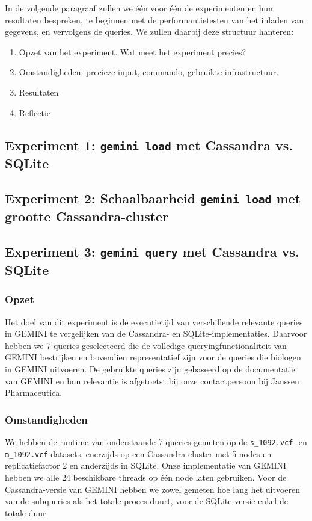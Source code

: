 In de volgende paragraaf zullen we \'e\'en voor \'e\'en de experimenten en hun resultaten bespreken, te beginnen met de performantietesten van het inladen van gegevens, en vervolgens de queries. We zullen daarbij deze structuur hanteren:
\begin{enumerate}
\item Opzet van het experiment. Wat meet het experiment precies?
\item Omstandigheden: precieze input, commando, gebruikte infrastructuur.
\item Resultaten
\item Reflectie
\end{enumerate}

\subsection{Experiment 1: \texttt{gemini load} met Cassandra vs. SQLite}
\label{exp1}
\subsection{Experiment 2: Schaalbaarheid \texttt{gemini load} met grootte Cassandra-cluster}
\label{exp2}
\subsection{Experiment 3: \texttt{gemini query} met Cassandra vs. SQLite}
\label{exp3}

\subsubsection{Opzet}
Het doel van dit experiment is de executietijd van verschillende relevante queries in GEMINI te vergelijken van de Cassandra- en SQLite-implementaties. Daarvoor hebben we 7 queries geselecteerd die de volledige queryingfunctionaliteit van GEMINI bestrijken en bovendien representatief zijn voor de queries die biologen in GEMINI uitvoeren. De gebruikte queries zijn gebaseerd op de documentatie van GEMINI en hun relevantie is afgetoetst bij onze contactpersoon bij Janssen Pharmaceutica.

\subsubsection{Omstandigheden}

We hebben de runtime van onderstaande 7 queries gemeten op de \texttt{s\_1092.vcf}- en \texttt{m\_1092.vcf}-datasets, enerzijds op een Cassandra-cluster met 5 nodes en replicatiefactor 2 en anderzijds in SQLite. Onze implementatie van GEMINI hebben we alle 24 beschikbare threads op \'e\'en node laten gebruiken. Voor de Cassandra-versie van GEMINI hebben we zowel gemeten hoe lang het uitvoeren van de subqueries als het totale proces duurt, voor de SQLite-versie enkel de totale duur.

